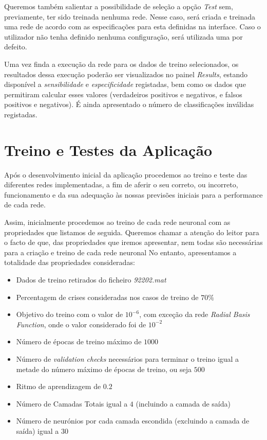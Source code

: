 \documentclass{article}
\begin{document}
Queremos também salientar a possibilidade de seleção a opção \emph{Test} sem, previamente, ter sido treinada nenhuma rede. Nesse caso, será criada e treinada uma rede de acordo com as especificações para esta definidas na interface. Caso o utilizador não tenha definido nenhuma configuração, será utilizada uma por defeito.

Uma vez finda a execução da rede para os dados de treino selecionados, os resultados dessa execução poderão ser visualizados no painel \emph{Results}, estando disponível a \emph{sensibilidade} e \emph{especificidade} registadas, bem como os dados que permitiram calcular esses valores (verdadeiros positivos e negativos, e falsos positivos e negativos). É ainda apresentado o número de classificações inválidas registadas. 

\pagebreak

\section{Treino e Testes da Aplicação}
\label{sec:train_tests}

Após o desenvolvimento inicial da aplicação procedemos ao treino e teste das diferentes redes implementadas, a fim de aferir o seu correto, ou incorreto, funcionamento e da sua adequação às nossas previsões iniciais para a performance de cada rede.

Assim, inicialmente procedemos ao treino de cada rede neuronal com as propriedades que listamos de seguida. Queremos chamar a atenção do leitor para o facto de que, das propriedades que iremos apresentar, nem todas são necessárias para a criação e treino de cada rede neuronal No entanto, apresentamos a totalidade das propriedades consideradas:

\begin{itemize}
\item Dados de treino retirados do ficheiro \emph{92202.mat}

\item Percentagem de crises consideradas nos casos de treino de $70\%$

\item Objetivo do treino com o valor de $10^{-6}$, com exceção da rede \emph{Radial Basis Function}, onde o valor considerado foi de $10^{-2}$

\item Número de épocas de treino máximo de $1000$

\item Número de \emph{validation checks} necessários para terminar o treino igual a metade do número máximo de épocas de treino, ou seja $500$

\item Ritmo de aprendizagem de $0.2$

\item Número de Camadas Totais igual a $4$ (incluindo a camada de saída)

\item Número de neurónios por cada camada escondida (excluindo a camada de saída) igual a $30$
\end{itemize}
\end{document}
